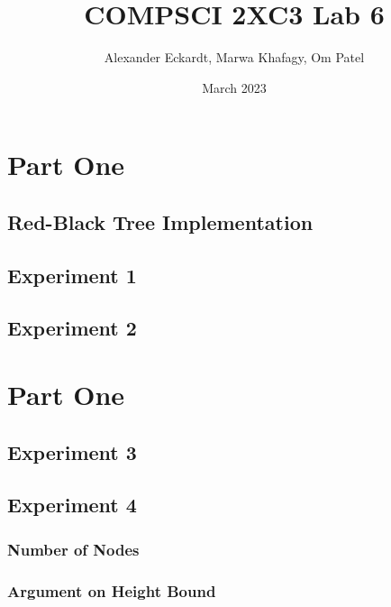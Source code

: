 \documentclass{article}
\title{COMPSCI 2XC3 Lab 6}
\author{Alexander Eckardt, Marwa Khafagy, Om Patel}
\date{March 2023}
\begin{document}
\maketitle
\newpage

\tableofcontents
\newpage



\section{Part One}
\subsection{Red-Black Tree Implementation}
\subsection{Experiment 1}
\subsection{Experiment 2}



\section{Part One}
\subsection{Experiment 3}
\subsection{Experiment 4}
\subsubsection{Number of Nodes}
\subsubsection{Argument on Height Bound}
\end{document}
